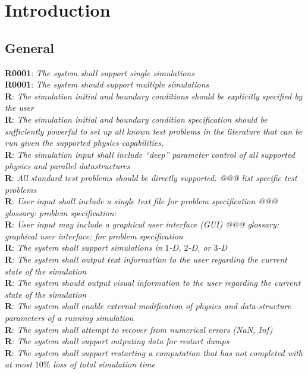 \documentclass{book}
\newcommand{\req}[2]{\textbf{R#1}: \textit{#2} \\}
\begin{document}

\chapter{Introduction} \label{s:intro}

\section{General}

\req{0001}{The system shall support single simulations}
\req{0001}{The system should support multiple simulations}
\req{}{The simulation initial and boundary conditions should be explicitly specified by the user}
\req{}{The simulation initial and boundary condition specification should be sufficiently powerful to set up all
   known test problems in the literature that can be run given the
   supported physics capabilities.}
\req{}{The simulation input shall include ``deep'' parameter control of all supported physics and parallel datastructures}
\req{}{All standard test problems should be directly supported.  @@@ list specific test problems}
\req{}{User input shall include a single text file for problem specification @@@ glossary: problem specification: }
\req{}{User input may include a graphical user interface (GUI) @@@ glossary: graphical user interface: for problem specification}
\req{}{The system shall support simulations in $1$-D, $2$-D, or $3$-D}
\req{}{The system shall output text information to the user regarding the current state of the simulation}
\req{}{The system should output visual information to the user regarding the current state of the simulation}
\req{}{The system shall enable external modification of physics and data-structure parameters of a running simulation}
\req{}{The system shall attempt to recover from numerical errors (NaN, Inf)}
\req{}{The system shall support outputing data for restart dumps}
\req{}{The system shall support restarting a computation that has not completed with at most $10\%$ loss of total simulation time}
\end{document}

